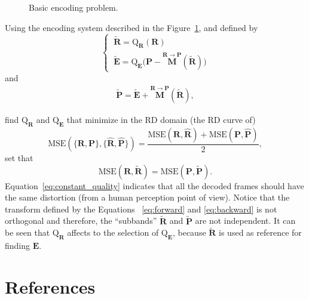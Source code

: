 \begin{figure}
  \centering
  \caption{Basic encoding problem.}
  \label{fig:problem}
\end{figure}

Using the encoding system described in the Figure~\ref{fig:problem}, and defined by
\begin{equation}
  \left\{\
    \begin{array}{l}
      \tilde{\mathbf R} = \text{Q}_{\mathbf R}({\mathbf R}) \\
      \tilde{\mathbf E} = \text{Q}_{\mathbf E}\big({\mathbf P}-\overset{{\mathbf R}\rightarrow {\mathbf P}}{\mathbf M}(\tilde{\mathbf R})\big)
    \end{array}
  \right.
  \label{eq:forward}
\end{equation}
and
\begin{equation}
  \begin{array}{l}
    \tilde{\mathbf P} = \tilde{\mathbf E} + \overset{{\mathbf R}\rightarrow {\mathbf P}}{\mathbf M}(\tilde{\mathbf R}),
  \end{array}
  \label{eq:backward}
\end{equation}

find $\text{Q}_{\mathbf{R}}$ and $\text{Q}_{\mathbf{E}}$ that minimize in the RD domain (the RD curve of)
\begin{equation}
  \text{MSE}(\{\mathbf{R},\mathbf{P}\},\{\hat{\mathbf{R}},\hat{\mathbf{P}}\}) = \frac{\text{MSE}({\mathbf R},\hat{\mathbf R}) + \text{MSE}({\mathbf P},\hat{\mathbf P})}{2},
\end{equation}
set that
\begin{equation}
  \text{MSE}({\mathbf R},\tilde{\mathbf R}) = \text{MSE}({\mathbf P},\tilde{\mathbf P}).
  \label{eq:constant_quality}
\end{equation}
Equation~\ref{eq:constant_quality} indicates that all the decoded
frames should have the same distortion (from a human perception point
of view). Notice that the transform defined by the Equations
~\ref{eq:forward} and \ref{eq:backward} is not orthogonal and
therefore, the ``subbands'' $\tilde{\mathbf R}$ and
$\tilde{\mathbf P}$ are not independent. It can be seen that
$\text{Q}_{\mathbf R}$ affects to the selection of
$\text{Q}_{\mathbf E}$, because $\tilde{\mathbf R}$ is used as
reference for finding ${\mathbf E}$.


\section{References}

\renewcommand{\addcontentsline}[3]{}%


